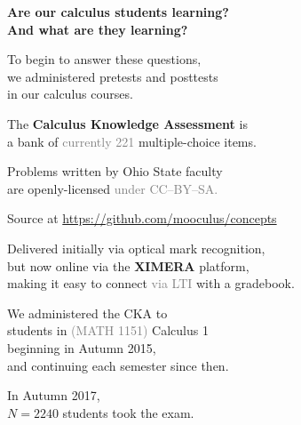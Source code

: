 \documentclass[14pt,aspectratio=169]{beamer}
\begin{document}
\begin{frame}
  \Large
  \vfill
  
  \textbf{Are our calculus students learning?} \\
  \textbf{And what are they learning?}

  \vfill
  
  To begin to answer these questions, \\
  \quad we administered pretests and posttests \\
  \quad in our calculus courses.
  
\end{frame}

\begin{frame}
  \large
  
  The \textbf{Calculus Knowledge Assessment} is \\
  \quad a bank of \textcolor{gray}{currently 221} multiple-choice items.

  \vfill
  
  Problems written by Ohio State faculty\\
  \quad are openly-licensed \textcolor{gray}{under CC--BY--SA.}

  \vfill

  Source at \url{https://github.com/mooculus/concepts}
  
  \vfill

  Delivered initially via optical mark recognition, \\
  \quad but now online via the \textbf{\textsf{XIMERA}} platform, \\
  \quad making it easy to connect \textcolor{gray}{via LTI} with a gradebook.
  
\end{frame}

\begin{frame}
  \large
  
  We administered the CKA to \\
  \quad students in \textcolor{gray}{(MATH 1151)} Calculus 1 \\
  \quad beginning in Autumn 2015, \\
  \quad\quad and continuing each semester since then.

  \vfill
  
  In Autumn 2017, \\
  \quad $N = 2240$ students took the exam.
\end{frame}
\end{document}
